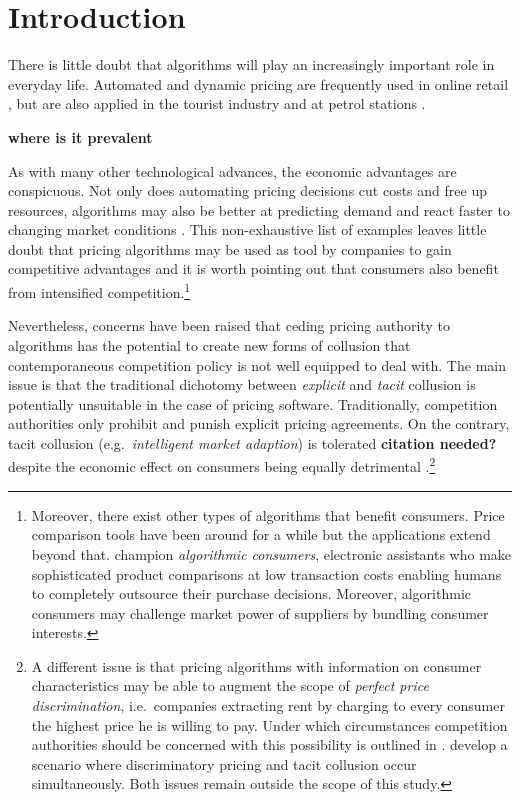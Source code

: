 \section{Introduction}

There is little doubt that algorithms will play an increasingly important role in everyday life. Automated and dynamic pricing are frequently used in online retail \parencite{chen_empirical_2016}, but are also applied in the tourist industry \parencite[p.4]{den_boer_dynamic_2015} and at petrol stations \parencite[pp.7-9]{assad_algorithmic_2020}. 

\textbf{where is it prevalent}


As with many other technological advances, the economic advantages are conspicuous. Not only does automating pricing decisions cut costs and free up resources, algorithms may also be better at predicting demand and react faster to changing market conditions \parencite[p. 15]{oecd_algorithms_2017}. 
This non-exhaustive list of examples leaves little doubt that pricing algorithms may be used as tool by companies to gain competitive advantages and it is worth pointing out that consumers also benefit from intensified competition.\footnote{Moreover, there exist other types of algorithms that benefit consumers. Price comparison tools have been around for a while but the applications extend beyond that. \textcite{gal_algorithmic_2017} champion \emph{algorithmic consumers}, electronic assistants who make sophisticated product comparisons at low transaction costs enabling humans to completely outsource their purchase decisions. Moreover, algorithmic consumers may challenge market power of suppliers by bundling consumer interests.}

Nevertheless, concerns have been raised that ceding pricing authority to algorithms has the potential to create new forms of collusion that contemporaneous competition policy is not well equipped to deal with. The main issue is that the traditional dichotomy between \emph{explicit} and \emph{tacit} collusion is potentially unsuitable in the case of pricing software. Traditionally, competition authorities only prohibit and punish explicit pricing agreements. On the contrary, tacit collusion (e.g.\ \emph{intelligent market adaption}) is tolerated \textbf{citation needed?} despite the economic effect on consumers being equally detrimental \parencite[p. 141]{motta_competition_2004}.\footnote{A different issue is that pricing algorithms with information on consumer characteristics may be able to augment the scope of \emph{perfect price discrimination}, i.e.\ companies extracting rent by charging to every consumer the highest price he is willing to pay. Under which circumstances competition authorities should be concerned with this possibility is outlined in \textcite{oecd_price_2016}. \textcite{ezrachi_algorithmic_2017} develop a scenario where discriminatory pricing and tacit collusion occur simultaneously. Both issues remain outside the scope of this study.}


